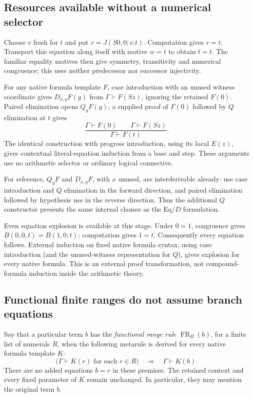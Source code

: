 \documentclass[11pt,letterpaper]{article}
\theoremstyle{definition}\newtheorem{definition}[theorem]{Definition}
\theoremstyle{remark}\newtheorem{remark}[theorem]{Remark}
\begin{document}
\subsection{Resources available without a numerical selector}

Choose $v$ fresh for $t$ and put $r=J(S0,0;v.t)$.  Computation gives
$r=t$.  Transport this equation along itself with motive $w=t$ to obtain
$t=t$.  The familiar equality motives then give symmetry, transitivity
and numerical congruence; this uses neither predecessor nor successor
injectivity.

For any native formula template $F$, case introduction with an unused
witness coordinate gives $D_{x,y}F(y)$ from
$\Gamma\vdash F(Sz)$, ignoring the retained $F(0)$.  Paired elimination
opens $Q_yF(y)$; a supplied proof of $F(0)$ followed by $Q$ elimination
at $t$ gives
\[
 \frac{\Gamma\vdash F(0)\qquad\Gamma\vdash F(Sz)}
      {\Gamma\vdash F(t)}. \tag{Native NC}\label{nb:nc}
\]
The identical construction with progress introduction, using its local
$E(z)$, gives contextual literal-equation induction from a base and step.
These arguments use no arithmetic selector or ordinary logical connective.

For reference, $Q_yF$ and $D_{x,y}F$, with $x$ unused, are interderivable
already: use case introduction and $Q$ elimination in the forward
direction, and paired elimination followed by hypothesis use in the
reverse direction.  Thus the additional $Q$ constructor presents the
same internal clauses as the Eq/$D$ formulation.

Even equation explosion is available at this stage.  Under $0=1$,
congruence gives $B(0,0,t)=B(1,0,t)$; computation gives $1=t$.
Consequently every equation follows.  External induction on fixed native
formula syntax, using case introduction (and the unused-witness
representation for $Q$), gives explosion for every native formula.
This is an external proof transformation, not compound-formula induction
inside the arithmetic theory.

\subsection{Functional finite ranges do not assume branch equations}

Say that a particular term $b$ has the \emph{functional range rule}
$\operatorname{FR}_R(b)$, for a finite list of numerals $R$, when the
following metarule is derived for every native formula template $K$:
\[
 \bigl(\Gamma\vdash K(r)\text{ for each }r\in R\bigr)
 \quad\Longrightarrow\quad\Gamma\vdash K(b).
 \tag{FR}\label{nb:fr}
\]
There are no added equations $b=r$ in these premises.  The retained
context and every fixed parameter of $K$ remain unchanged.  In
particular, they may mention the original term $b$.
\end{document}
